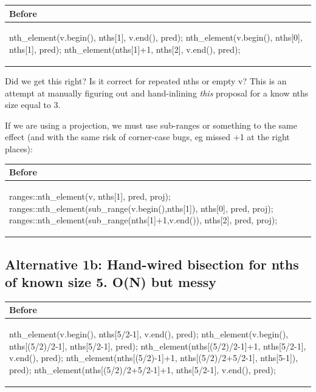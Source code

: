 \hspace{3ex}\begin{tabular}{|l|} 
  \hline 
  \textbf{Before} \\
  \hline 
\begin{codeblock} 
nth_element(v.begin(), nths[1], v.end(), pred);
nth_element(v.begin(), nths[0], nths[1], pred);
nth_element(nths[1]+1, nths[2], v.end(), pred);
\end{codeblock} 
\\
\hline 
\end{tabular} 

Did we get this right? Is it correct for repeated nths or empty v?
This is an attempt at manually figuring out and hand-inlining \emph{this} proposal for a know nths size equal to 3.

If we are using a projection, we must use sub-ranges or something to the same effect (and with the same risk of corner-case bugs, eg missed +1 at the right places):

\hspace{3ex}\begin{tabular}{|l|} 
  \hline 
  \textbf{Before} \\
  \hline 
\begin{codeblock} 
ranges::nth_element(v, nths[1], pred, proj);
ranges::nth_element(sub_range(v.begin(),nths[1]), nths[0], pred, proj);
ranges::nth_element(sub_range(nths[1]+1,v.end()), nths[2], pred, proj);
\end{codeblock} 
\\
\hline 
\end{tabular} 
\subsection*{Alternative 1b: Hand-wired bisection for nths of known size 5. O(N) but messy}

\hspace{3ex}\begin{tabular}{|l|} 
  \hline 
  \textbf{Before} \\
  \hline 
\begin{codeblock} 
nth_element(v.begin(), nths[5/2-1], v.end(), pred);
nth_element(v.begin(), nths[(5/2)/2-1], nths[5/2-1], pred);
nth_element(nths[(5/2)/2-1]+1, nths[5/2-1], v.end(), pred);
nth_element(nths[(5/2)-1]+1, nths[(5/2)/2+5/2-1], nths[5-1]), pred);
nth_element(nths[(5/2)/2+5/2-1]+1, nths[5/2-1], v.end(), pred);
\end{codeblock} 
\\
\hline 
\end{tabular} 

